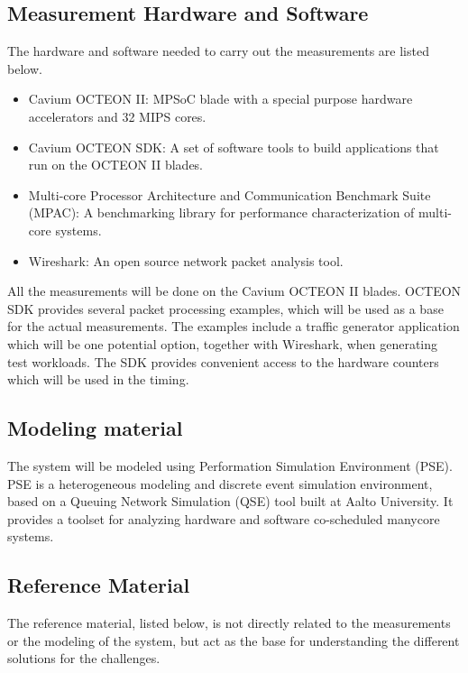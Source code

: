 \subsection{Measurement Hardware and Software}
The hardware and software needed to carry out the measurements are listed below.

\begin{itemize}

\item Cavium OCTEON II: MPSoC blade with a special purpose hardware accelerators and 32 MIPS cores.
\item Cavium OCTEON SDK: A set of software tools to build applications that run on the OCTEON II blades.
\item Multi-core Processor Architecture and Communication Benchmark Suite (MPAC): A benchmarking library for performance characterization of multi-core systems.
\item Wireshark: An open source network packet analysis tool.

\end{itemize}

All the measurements will be done on the Cavium OCTEON II blades. OCTEON SDK provides several packet processing examples, which will be used as a base for the actual measurements. The examples include a traffic generator application which will be one potential option, together with Wireshark, when generating test workloads. The SDK provides convenient access to the hardware counters which will be used in the timing.

\subsection{Modeling material}
The system will be modeled using Performation Simulation Environment (PSE). PSE is a heterogeneous modeling and discrete event simulation environment, based on a Queuing Network Simulation (QSE) tool built at Aalto University. It provides a toolset for analyzing hardware and software co-scheduled manycore systems.

\subsection{Reference Material}
The reference material, listed below, is not directly related to the measurements or the modeling of the system, but act as the base for understanding the different solutions for the challenges.

